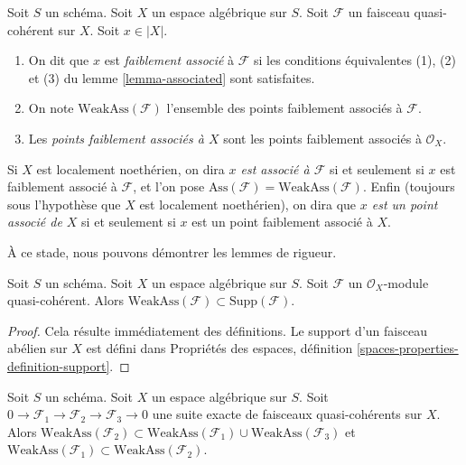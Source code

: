 \begin{definition}
\label{definition-weakly-associated}
Soit $S$ un schéma. Soit $X$ un espace algébrique sur $S$.
Soit $\mathcal{F}$ un faisceau quasi-cohérent sur $X$.
Soit $x \in |X|$.
\begin{enumerate}
\item On dit que $x$ est {\it faiblement associé} à $\mathcal{F}$
si les conditions équivalentes (1), (2) et (3) du
lemme \ref{lemma-associated} sont satisfaites.
\item On note $\text{WeakAss}(\mathcal{F})$ l'ensemble des points
faiblement associés à $\mathcal{F}$.
\item Les {\it points faiblement associés à $X$} sont les points
faiblement associés à $\mathcal{O}_X$.
\end{enumerate}
Si $X$ est localement noethérien, on dira
{\it $x$ est associé à $\mathcal{F}$}
si et seulement si $x$ est faiblement associé à $\mathcal{F}$, et l'on pose
$\text{Ass}(\mathcal{F}) = \text{WeakAss}(\mathcal{F})$.
Enfin (toujours sous l'hypothèse que $X$ est localement noethérien),
on dira que {\it $x$ est un point associé de $X$} si et seulement si
$x$ est un point faiblement associé à $X$.
\end{definition}

\noindent
À ce stade, nous pouvons démontrer les lemmes de rigueur.

\begin{lemma}
\label{lemma-weakly-ass-support}
Soit $S$ un schéma. Soit $X$ un espace algébrique sur $S$.
Soit $\mathcal{F}$ un $\mathcal{O}_X$-module quasi-cohérent.
Alors $\text{WeakAss}(\mathcal{F}) \subset \text{Supp}(\mathcal{F})$.
\end{lemma}

\begin{proof}
Cela résulte immédiatement des définitions. Le support d'un faisceau abélien
sur $X$ est défini dans Propriétés des espaces, définition
\ref{spaces-properties-definition-support}.
\end{proof}

\begin{lemma}
\label{lemma-ses-weakly-ass}
Soit $S$ un schéma. Soit $X$ un espace algébrique sur $S$.
Soit $0 \to \mathcal{F}_1 \to \mathcal{F}_2 \to \mathcal{F}_3 \to 0$
une suite exacte de faisceaux quasi-cohérents sur $X$.
Alors
$\text{WeakAss}(\mathcal{F}_2) \subset
\text{WeakAss}(\mathcal{F}_1) \cup \text{WeakAss}(\mathcal{F}_3)$
et
$\text{WeakAss}(\mathcal{F}_1) \subset \text{WeakAss}(\mathcal{F}_2)$.
\end{lemma}

